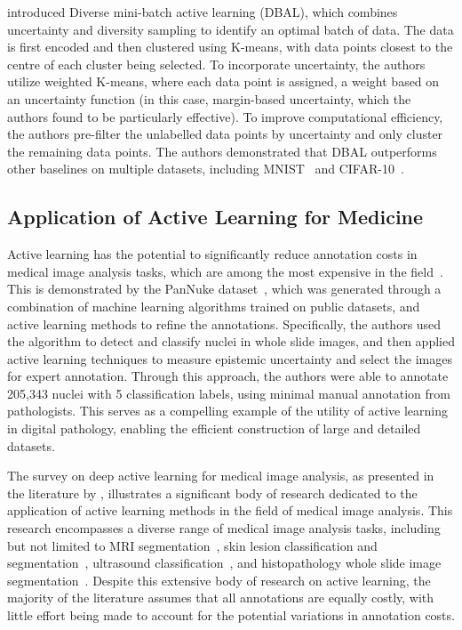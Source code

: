 \cite{zhdanov2019diverse} introduced Diverse mini-batch active learning (DBAL), which combines uncertainty and diversity sampling to identify an optimal batch of data. The data is first encoded and then clustered using K-means, with data points closest to the centre of each cluster being selected. To incorporate uncertainty, the authors utilize weighted K-means, where each data point is assigned, a weight based on an uncertainty function (in this case, margin-based uncertainty, which the authors found to be particularly effective). To improve computational efficiency, the authors pre-filter the unlabelled data points by uncertainty and only cluster the remaining data points. The authors demonstrated that DBAL outperforms other baselines on multiple datasets, including MNIST~\citep{lecun1998gradient} and CIFAR-10~\citep{krizhevsky2009learning}.

\subsection{Application of Active Learning for Medicine}
\label{subsec:active_applications}
Active learning has the potential to significantly reduce annotation costs in medical image analysis tasks, which are among the most expensive in the field~\citep{budd2021survey}. This is demonstrated by the PanNuke dataset~\citep{gamper2019pannuke, gamper2020pannuke}, which was generated through a combination of machine learning algorithms trained on public datasets, and active learning methods to refine the annotations. Specifically, the authors used the algorithm to detect and classify nuclei in whole slide images, and then applied active learning techniques to measure epistemic uncertainty and select the images for expert annotation. Through this approach, the authors were able to annotate 205,343 nuclei with 5 classification labels, using minimal manual annotation from pathologists. This serves as a compelling example of the utility of active learning in digital pathology, enabling the efficient construction of large and detailed datasets.

The survey on deep active learning for medical image analysis, as presented in the literature by \cite{budd2021survey}, illustrates a significant body of research dedicated to the application of active learning methods in the field of medical image analysis. This research encompasses a diverse range of medical image analysis tasks, including but not limited to MRI segmentation~\citep{konyushkova2019geometry,zhao2019data}, skin lesion classification and segmentation~\citep{shi2019active, gorriz2017cost}, ultrasound classification~\cite{liu2020semi}, and histopathology whole slide image segmentation~\citep{folmsbee2021whole, jin2021reducing}. Despite this extensive body of research on active learning, the majority of the literature assumes that all annotations are equally costly, with little effort being made to account for the potential variations in annotation costs.

